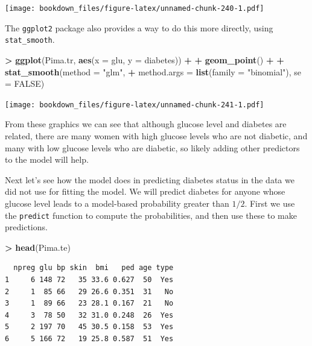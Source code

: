 \documentclass[
]{krantz}
\makeatletter
\newenvironment{Shaded}{\begin{snugshade}}{\end{snugshade}}
\newcommand{\DataTypeTok}[1]{\textcolor[rgb]{0.27,0.27,0.27}{#1}}
\newcommand{\KeywordTok}[1]{\textcolor[rgb]{0.27,0.27,0.27}{\textbf{#1}}}
\newcommand{\NormalTok}[1]{#1}
\newcommand{\OperatorTok}[1]{\textcolor[rgb]{0.43,0.43,0.43}{\textbf{#1}}}
\newcommand{\OtherTok}[1]{\textcolor[rgb]{0.37,0.37,0.37}{#1}}
\newcommand{\StringTok}[1]{\textcolor[rgb]{0.5,0.5,0.5}{#1}}
\newenvironment{kframe}{%
\medskip{}
\setlength{\fboxsep}{.8em}
 \def\at@end@of@kframe{}%
 \ifinner\ifhmode%
  \def\at@end@of@kframe{\end{minipage}}%
  \begin{minipage}{\columnwidth}%
 \fi\fi%
 \def\FrameCommand##1{\hskip\@totalleftmargin \hskip-\fboxsep
 \colorbox{shadecolor}{##1}\hskip-\fboxsep
     \hskip-\linewidth \hskip-\@totalleftmargin \hskip\columnwidth}%
 \MakeFramed {\advance\hsize-\width
   \@totalleftmargin\z@ \linewidth\hsize
   \@setminipage}}%
 {\par\unskip\endMakeFramed%
 \at@end@of@kframe}
\renewenvironment{Shaded}{\begin{kframe}}{\end{kframe}}
\makeatother
\begin{document}
\texttt{[image: bookdown\_files/figure-latex/unnamed-chunk-240-1.pdf]}

The \texttt{ggplot2} package also provides a way to do this more directly, using \texttt{stat\_smooth}.

\begin{Shaded}
\begin{Highlighting}[]
\OperatorTok{\textgreater{}}\StringTok{ }\KeywordTok{ggplot}\NormalTok{(Pima.tr, }\KeywordTok{aes}\NormalTok{(}\DataTypeTok{x =}\NormalTok{ glu, }\DataTypeTok{y =}\NormalTok{ diabetes)) }\OperatorTok{+}\StringTok{ }
\OperatorTok{+}\StringTok{   }\KeywordTok{geom\_point}\NormalTok{() }\OperatorTok{+}\StringTok{ }
\OperatorTok{+}\StringTok{   }\KeywordTok{stat\_smooth}\NormalTok{(}\DataTypeTok{method =} \StringTok{"glm"}\NormalTok{, }
\OperatorTok{+}\StringTok{               }\DataTypeTok{method.args =} \KeywordTok{list}\NormalTok{(}\DataTypeTok{family =} \StringTok{"binomial"}\NormalTok{), }\DataTypeTok{se =} \OtherTok{FALSE}\NormalTok{)}
\end{Highlighting}
\end{Shaded}

\texttt{[image: bookdown\_files/figure-latex/unnamed-chunk-241-1.pdf]}

From these graphics we can see that although glucose level and diabetes are related, there are many women with high glucose levels who are not diabetic, and many with low glucose levels who are diabetic, so likely adding other predictors to the model will help.

Next let's see how the model does in predicting diabetes status in the data we did not use for fitting the model. We will predict diabetes for anyone whose glucose level leads to a model-based probability greater than \(1/2\). First we use the \texttt{predict} function to compute the probabilities, and then use these to make predictions.

\begin{Shaded}
\begin{Highlighting}[]
\OperatorTok{\textgreater{}}\StringTok{ }\KeywordTok{head}\NormalTok{(Pima.te)}
\end{Highlighting}
\end{Shaded}

\begin{verbatim}
  npreg glu bp skin  bmi   ped age type
1     6 148 72   35 33.6 0.627  50  Yes
2     1  85 66   29 26.6 0.351  31   No
3     1  89 66   23 28.1 0.167  21   No
4     3  78 50   32 31.0 0.248  26  Yes
5     2 197 70   45 30.5 0.158  53  Yes
6     5 166 72   19 25.8 0.587  51  Yes
\end{verbatim}
\end{document}
